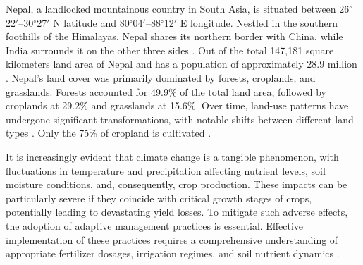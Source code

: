 Nepal, a landlocked mountainous country in South Asia, is situated between 26$^\circ$22$'$–30$^\circ$27$'$ N latitude and 80$^\circ$04$'$–88$^\circ$12$'$ E longitude. Nestled in the southern foothills of the Himalayas, Nepal shares its northern border with China, while India surrounds it on the other three sides \parencite{ningLandUseCover}. Out of the total 147,181 square kilometers land area of Nepal \parencite{timilsinaAGRICULTURELANDUSE2019} and has a population of approximately 28.9 million \parencite{ningLandUseCover}. Nepal's land cover was primarily dominated by forests, croplands, and grasslands. Forests accounted for 49.9\% of the total land area, followed by croplands at 29.2\% and grasslands at 15.6\%. Over time, land-use patterns have undergone significant transformations, with notable shifts between different land types \parencite{ningLandUseCover}. Only the 75\% of cropland is cultivated \parencite{timilsinaAGRICULTURELANDUSE2019}.

It is increasingly evident that climate change is a tangible phenomenon, with fluctuations in temperature and precipitation affecting nutrient levels, soil moisture conditions, and, consequently, crop production. These impacts can be particularly severe if they coincide with critical growth stages of crops, potentially leading to devastating yield losses. To mitigate such adverse effects, the adoption of adaptive management practices is essential. Effective implementation of these practices requires a comprehensive understanding of appropriate fertilizer dosages, irrigation regimes, and soil nutrient dynamics \parencite{shresthaAssessmentClimateChange2017}.

